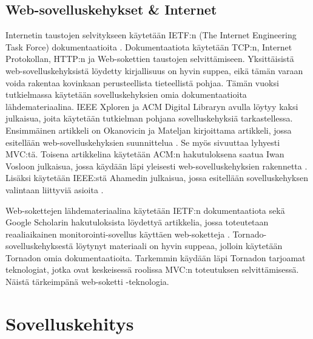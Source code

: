 \documentclass[utf8]{gradu3}
\begin{document}
\section{Web-sovelluskehykset \& Internet}
Internetin taustojen selvitykseen käytetään IETF:n (The Internet Engineering Task Force) dokumentaatioita \parencite{ietf}. Dokumentaatiota käytetään TCP:n, Internet Protokollan, HTTP:n ja Web-sokettien taustojen selvittämiseen. Yksittäisistä web-sovelluskehyksistä löydetty kirjallisuus on hyvin
suppea, eikä tämän varaan voida rakentaa kovinkaan perusteellista
tieteellistä pohjaa. Tämän vuoksi tutkielmassa käytetään
sovelluskehyksien omia dokumentaatioita lähdemateriaalina. IEEE Xploren ja ACM Digital Libraryn avulla löytyy kaksi julkaisua, 
joita käytetään tutkielman pohjana sovelluskehyksiä
tarkastellessa. Ensimmäinen artikkeli on Okanovicin ja Mateljan
kirjoittama artikkeli, jossa esitellään web-sovelluskehyksien suunnittelua \parencite{ockanovic}. 
Se myös sivuuttaa lyhyesti MVC:tä. Toisena artikkelina käytetään ACM:n hakutuloksena saatua Iwan
Vosloon julkaisua, jossa käydään läpi yleisesti web-sovelluskehyksien
rakennetta \parencite{vosloo}. Lisäksi käytetään
IEEE:stä Ahamedin julkaisua, jossa esitellään sovelluskehyksen valintaan liittyviä asioita \parencite{towards_framework}.

 Web-sokettejen lähdemateriaalina käytetään IETF:n dokumentaatiota \parencite{websocket} sekä Google Scholarin hakutuloksista löydettyä artikkelia, jossa toteutetaan reaaliaikainen monitorointi-sovellus käyttäen web-soketteja \parencite{websocket_ajax}. Tornado-sovelluskehyksestä löytynyt materiaali on hyvin suppeaa, jolloin käytetään Tornadon omia dokumentaatioita. Tarkemmin käydään läpi Tornadon tarjoamat teknologiat, jotka ovat keskeisessä roolissa MVC:n toteutuksen selvittämisessä. Näistä tärkeimpänä web-soketti -teknologia.

\chapter{Sovelluskehitys}
\end{document}
